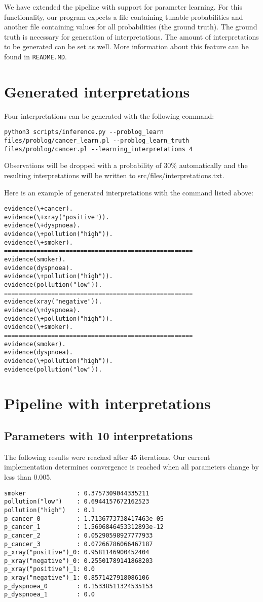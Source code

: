 We have extended the pipeline with support for parameter learning. For this functionality, our program expects a file containing tunable probabilities and another file containing values for all probabilities (the ground truth). The ground truth is necessary for generation of interpretations. The amount of interpretations to be generated can be set as well. More information about this feature can be found in \texttt{README.MD}.

\section{Generated interpretations}
Four interpretations can be generated with the following command:
\begin{lstlisting}
python3 scripts/inference.py --problog_learn files/problog/cancer_learn.pl --problog_learn_truth files/problog/cancer.pl --learning_interpretations 4
\end{lstlisting}
Observations will be dropped with a probability of 30\% automatically and the resulting interpretations will be written to src/files/interpretations.txt.

Here is an example of generated interpretations with the command listed above:
\begin{lstlisting}
evidence(\+cancer).
evidence(\+xray("positive")).
evidence(\+dyspnoea).
evidence(\+pollution("high")).
evidence(\+smoker).
====================================================
evidence(smoker).
evidence(dyspnoea).
evidence(\+pollution("high")).
evidence(pollution("low")).
====================================================
evidence(xray("negative")).
evidence(\+dyspnoea).
evidence(\+pollution("high")).
evidence(\+smoker).
====================================================
evidence(smoker).
evidence(dyspnoea).
evidence(\+pollution("high")).
evidence(pollution("low")).
\end{lstlisting}

\section{Pipeline with interpretations}

\subsection{Parameters with 10 interpretations}
The following results were reached after 45 iterations. Our current implementation determines convergence is reached when all parameters change by less than 0.005.
\begin{lstlisting}
smoker              : 0.3757309044335211
pollution("low")    : 0.6944157672162523
pollution("high")   : 0.1
p_cancer_0          : 1.7136773738417463e-05
p_cancer_1          : 1.5696846453312893e-12
p_cancer_2          : 0.05290598927777933
p_cancer_3          : 0.07266786066467187
p_xray("positive")_0: 0.9581146900452404
p_xray("negative")_0: 0.25501789141868203
p_xray("positive")_1: 0.0
p_xray("negative")_1: 0.8571427918086106
p_dyspnoea_0        : 0.15338511324535153
p_dyspnoea_1        : 0.0
\end{lstlisting}

